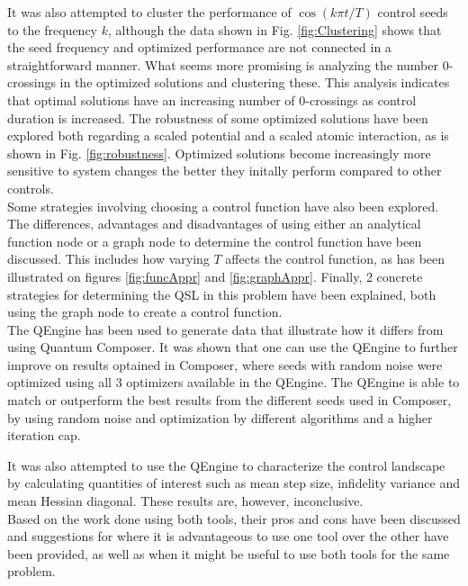 \documentclass[a4paper, twocolumn]{revtex4-1}
\begin{document}
It was also attempted to cluster the performance of $\cos(k\pi t/T)$ control seeds to the frequency $k$, although the data shown in Fig. \ref{fig:Clustering} shows that the seed frequency and optimized performance are not connected in a straightforward manner. What seems more promising is analyzing the number 0-crossings in the optimized solutions and clustering these. This analysis indicates that optimal solutions have an increasing number of 0-crossings as control duration is increased. The robustness of some optimized solutions have been explored both regarding a scaled potential and a scaled atomic interaction, as is shown in Fig. \ref{fig:robustness}. Optimized solutions become increasingly more sensitive to system changes the better they initally perform compared to other controls. \\

Some strategies involving choosing a control function have also been explored. The differences, advantages and disadvantages of using either an analytical function node or a graph node to determine the control function have been discussed. This includes how varying $T$ affects the control function, as has been illustrated on figures \ref{fig:funcAppr} and \ref{fig:graphAppr}. Finally, 2 concrete strategies for determining the QSL in this problem have been explained, both using the graph node to create a control function.\\

The QEngine has been used to generate data that illustrate how it differs from using Quantum Composer. It was shown that one can use the QEngine to further improve on results optained in Composer, where seeds with random noise were optimized using all 3 optimizers available in the QEngine. The QEngine is able to match or outperform the best results from the different seeds used in Composer, by using random noise and optimization by different algorithms and a higher iteration cap.

It was also attempted to use the QEngine to characterize the control landscape by calculating quantities of interest such as mean step size, infidelity variance and mean Hessian diagonal. These results are, however, inconclusive. \\

Based on the work done using both tools, their pros and cons have been discussed and suggestions for where it is advantageous to use one tool over the other have been provided, as well as when it might be useful to use both tools for the same problem. \\
\end{document}
